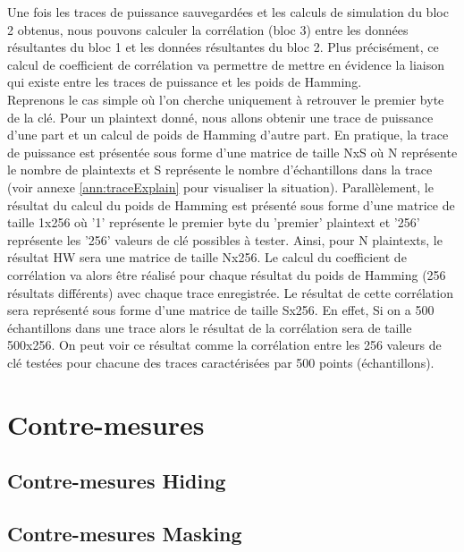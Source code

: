 \documentclass[oneside]{book}
\begin{document}
Une fois les traces de puissance sauvegardées et les calculs de simulation du bloc 2 obtenus, nous pouvons calculer la corrélation (bloc 3) entre les données résultantes du bloc 1 et les données résultantes du bloc 2. Plus précisément, ce calcul de coefficient de corrélation va permettre de mettre en évidence la liaison qui existe entre les traces de puissance et les poids de Hamming. \\ 
Reprenons le cas simple où l'on cherche uniquement à retrouver le premier byte de la clé. Pour un plaintext donné, nous allons obtenir une trace de puissance d'une part et un calcul de poids de Hamming d'autre part. En pratique, la trace de puissance est présentée sous forme d'une matrice de taille NxS où N représente le nombre de plaintexts et S représente le nombre d'échantillons dans la trace (voir annexe \ref{ann:traceExplain} pour visualiser la situation). Parallèlement, le résultat du calcul du poids de Hamming est présenté sous forme d'une matrice de taille 1x256 où '1' représente le premier byte du 'premier' plaintext et '256' représente les '256' valeurs de clé possibles à tester. Ainsi, pour N plaintexts, le résultat HW sera une matrice de taille Nx256. Le calcul du coefficient de corrélation va alors être réalisé pour chaque résultat du poids de Hamming (256 résultats différents) avec chaque trace enregistrée. Le résultat de cette corrélation sera représenté sous forme d'une matrice de taille Sx256. En effet, Si on a 500 échantillons dans une trace alors le résultat de la corrélation sera de taille 500x256. On peut voir ce résultat comme la corrélation entre les 256 valeurs de clé testées pour chacune des traces caractérisées par 500 points (échantillons).

\newpage


\chapter{Contre-mesures}

\section{Contre-mesures Hiding}
\label{sec:Introduction}

\section{Contre-mesures Masking}
\label{sec:Introduction}
\end{document}

